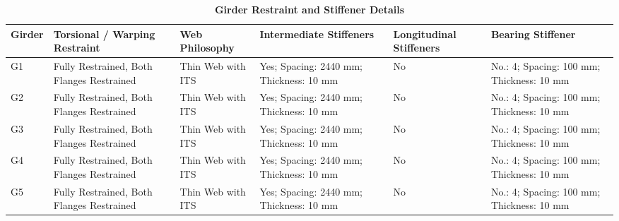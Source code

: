 \documentclass[12pt,a4paper]{report}
\numberwithin{table}{chapter}
\numberwithin{figure}{chapter}
\begin{document}
\vspace{4pt}
\begin{longtable}{|L{1.4cm}|p{2.2cm}|p{2.2cm}|p{3.0cm}|p{2.4cm}|p{2.2cm}|}
\caption{\textbf{Girder Restraint and Stiffener Details}}\\
\hline
\textbf{Girder} & \textbf{Torsional / Warp\-ing Restraint} & \textbf{Web Philo\-sophy} & \textbf{Inter\-mediate Stiffeners} & \textbf{Longi\-tudinal Stiffeners} & \textbf{Bearing Stiffener} \\[6pt]
\hline
\endfirsthead
\endhead

G1 & Fully Restrained, Both Flanges Restrained & Thin Web with ITS & Yes; Spacing: 2440 mm; Thickness: 10 mm & No & No.: 4; Spacing: 100 mm; Thickness: 10 mm \\[8pt]
\hline
G2 & Fully Restrained, Both Flanges Restrained & Thin Web with ITS & Yes; Spacing: 2440 mm; Thickness: 10 mm & No & No.: 4; Spacing: 100 mm; Thickness: 10 mm \\[8pt]
\hline
G3 & Fully Restrained, Both Flanges Restrained & Thin Web with ITS & Yes; Spacing: 2440 mm; Thickness: 10 mm & No & No.: 4; Spacing: 100 mm; Thickness: 10 mm \\[8pt]
\hline
G4 & Fully Restrained, Both Flanges Restrained & Thin Web with ITS & Yes; Spacing: 2440 mm; Thickness: 10 mm & No & No.: 4; Spacing: 100 mm; Thickness: 10 mm \\[8pt]
\hline
G5 & Fully Restrained, Both Flanges Restrained & Thin Web with ITS & Yes; Spacing: 2440 mm; Thickness: 10 mm & No & No.: 4; Spacing: 100 mm; Thickness: 10 mm \\[8pt]
\hline
\end{longtable}



\newpage

\vspace{0.4em}
\setlength{\tabcolsep}{4pt}
\setlength\LTleft{0pt}
\setlength\LTright{\fill}
\end{document}
